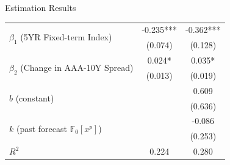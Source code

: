\documentclass[UTF8, 10pt]{beamer}
\begin{document}
\begin{CJK*}{UTF8}{gbsn}
\begin{frame}{Estimation Results}
\begin{table}[H]
\begin{tabular}{l c c}
            \midrule
            \multirow{2}{*}{$\beta_1$ (5YR Fixed-term Index)}
            & -0.235*** & -0.362*** \\
            & (0.074) & (0.128) \\
            \multirow{2}{*}{$\beta_2$ (Change in AAA-10Y Spread)}
            & 0.024* & 0.035* \\
            & (0.013) & (0.019) \\
            \multirow{2}{*}{$b$ (constant)}
            &  & 0.609   \\
            &  & (0.636)   \\
            \multirow{2}{*}{$k$ (past forecast $\mathbb{F}_{0}\left[x^p\right]$)}
            &  & -0.086 \\
            &  & (0.253) \\
            $R^2$ & 0.224 & 0.280  \\
        \bottomrule
        \end{tabular}
	\end{table}
\end{frame}


\end{CJK*}
\end{document}

